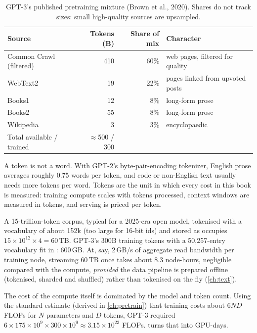 \begin{table}[t]
\centering
\small
\begin{tabular}{lrrl}
\toprule
Source & Tokens (B) & Share of mix & Character\\
\midrule
Common Crawl (filtered) & 410 & 60\% & web pages, filtered for quality\\
WebText2 & 19 & 22\% & pages linked from upvoted posts\\
Books1 & 12 & 8\% & long-form prose\\
Books2 & 55 & 8\% & long-form prose\\
Wikipedia & 3 & 3\% & encyclopaedic\\
\midrule
Total available / trained & $\approx$500 / 300 & & \\
\bottomrule
\end{tabular}
\caption{GPT-3's published pretraining mixture (Brown et al., 2020). Shares do not track sizes: small
high-quality sources are upsampled.}
\label{tab:landscape:gpt3data}
\end{table}

A token is not a word. With GPT-2's byte-pair-encoding tokenizer, English prose averages roughly
0.75 words per token, and code or non-English text usually needs more tokens per word. Tokens are the
unit in which every cost in this book is measured: training compute scales with tokens processed,
context windows are measured in tokens, and serving is priced per token.

\begin{napkinmath}
A 15-trillion-token corpus, typical for a 2025-era open model, tokenised with a vocabulary of about 152k
(too large for 16-bit ids) and stored as  occupies $15\times10^{12}\times 4 =
60$\,TB. GPT-3's 300B training tokens with a 50{,}257-entry vocabulary fit in :
$600$\,GB. At, say, 2\,GB/s of aggregate read bandwidth per training node, streaming 60\,TB once takes
about 8.3 node-hours, negligible compared with the compute, \emph{provided} the data pipeline is
prepared offline (tokenised, sharded and shuffled) rather than tokenised on the fly
(\cref{ch:text}).
\end{napkinmath}

The cost of the compute itself is dominated by the model and token count. Using the standard
estimate (derived in \cref{ch:pretrain}) that training costs about $6ND$ FLOPs for $N$ parameters and $D$
tokens, GPT-3 required $6 \times 175\times10^9 \times 300\times10^9 \approx 3.15\times10^{23}$ FLOPs.
 turns that into GPU-days.


